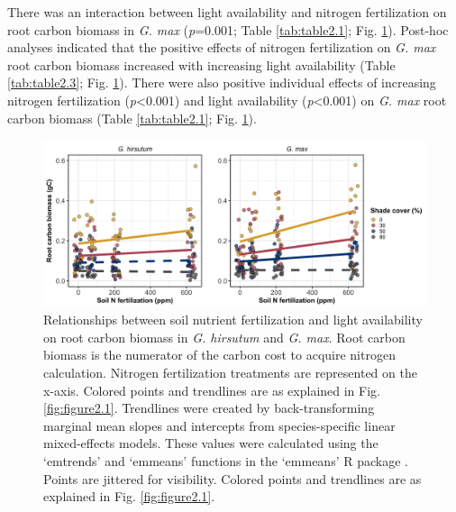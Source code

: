 There was an interaction between light availability and nitrogen fertilization on root carbon biomass in \textit{G. max} (\textit{p}=0.001; Table \ref{tab:table2.1}; Fig. \ref{fig:figure2.3}). Post-hoc analyses indicated that the positive effects of nitrogen fertilization on \textit{G. max} root carbon biomass increased with increasing light availability (Table \ref{tab:table2.3}; Fig. \ref{fig:figure2.3}). There were also positive individual effects of increasing nitrogen fertilization (\textit{p}<0.001) and light availability (\textit{p}<0.001) on \textit{G. max} root carbon biomass (Table \ref{tab:table2.1}; Fig. \ref{fig:figure2.3}).

\newpage
\begin{landscape}
\begin{figure}
    \centering
    \includegraphics[scale = 0.061]{ch2_LxN_Greenhouse/figs/fig3_rootCarbon.png}
    \caption[Relationships between soil nitrogen fertilization and light availability on root carbon biomass in \textit{G. hirsutum} and \textit{G. max}]{Relationships between soil nutrient fertilization and light availability on root carbon biomass in \textit{G. hirsutum} and \textit{G. max}. Root carbon biomass is the numerator of the carbon cost to acquire nitrogen calculation. Nitrogen fertilization treatments are represented on the x-axis. Colored points and trendlines are as explained in Fig. \ref{fig:figure2.1}. Trendlines were created by back-transforming marginal mean slopes and intercepts from species-specific linear mixed-effects models. These values were calculated using the ‘emtrends’ and ‘emmeans’ functions in the ‘emmeans’ R package . Points are jittered for visibility. Colored points and trendlines are as explained in Fig. \ref{fig:figure2.1}.}
    \label{fig:figure2.3}
\end{figure}
\end{landscape}
\clearpage

\newpage
